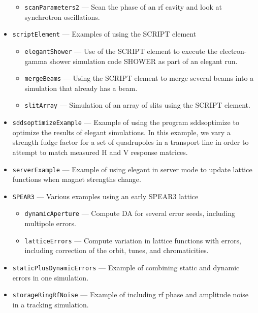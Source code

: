 \begin{itemize}
\begin{itemize}
\item \verb|scanParameters2| --- 
 Scan the phase of an rf cavity and look at synchrotron oscillations. 

\end{itemize}
\item \verb|scriptElement| --- 
 Examples of using the SCRIPT element 

\begin{itemize}
\item \verb|elegantShower| --- 
 Use of the SCRIPT element to execute the electron-gamma shower simulation code SHOWER as part of an elegant run. 

\item \verb|mergeBeams| --- 
 Using the SCRIPT element to merge several beams into a simulation that already has a beam. 

\item \verb|slitArray| --- 
 Simulation of an array of slits using the SCRIPT element. 

\end{itemize}
\item \verb|sddsoptimizeExample| --- 
 Example of using the program sddsoptimize to optimize the results of elegant simulations. In this example, we vary a strength fudge factor for a set of quadrupoles in a transport line in order to attempt to match measured H and V response matrices. 

\item \verb|serverExample| --- 
 Example of using elegant in server mode to update lattice functions when magnet strengths change. 

\item \verb|SPEAR3| --- 
 Various examples using an early SPEAR3 lattice 

\begin{itemize}
\item \verb|dynamicAperture| --- 
 Compute DA for several error seeds, including multipole errors. 

\item \verb|latticeErrors| --- 
 Compute variation in lattice functions with errors, including correction of the orbit, tunes, and chromaticities. 

\end{itemize}
\item \verb|staticPlusDynamicErrors| --- 
 Example of combining static and dynamic errors in one simulation. 

\item \verb|storageRingRfNoise| --- 
 Example of including rf phase and amplitude noise in a tracking simulation. 


\end{itemize}
